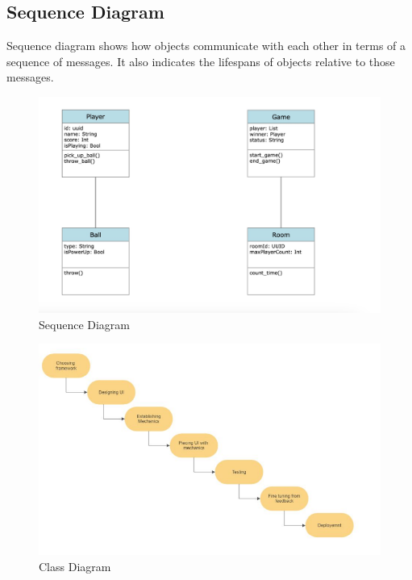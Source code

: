 \documentclass[12pt]{report}
\begin{document}
\subsection{Sequence Diagram}
Sequence diagram shows how objects communicate with each other in terms of a sequence 
of messages. It also indicates the lifespans of objects relative to those messages.
\vspace{1.5cm}
\begin{figure}[h]
\centering
\includegraphics[scale=0.9]{images14.png}
\caption{Sequence Diagram}
\label{Sequence Diagram}
\end{figure}

\clearpage

\vspace{1.5cm}
\begin{figure}[h]
\centering
\includegraphics[scale=0.9]{ Class Diagram.png}
\caption{ Class Diagram
}
\label{ Class Diagram
}
\end{figure}
\end{document}
